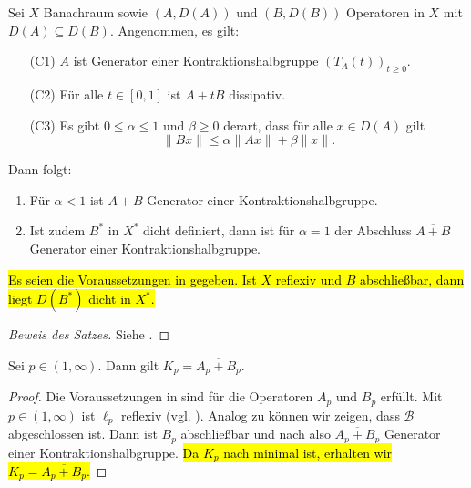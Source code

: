 \begin{fsatz}\label{toller satz}
Sei $X$ Banachraum sowie  $(A, D(A))$ und $(B, D(B))$ Operatoren in $X$ mit $D(A)\subseteq D(B)$. Angenommen, es gilt:
\begin{enumerate}
\item[\textnormal{(C1)}] $A$ ist Generator einer Kontraktionshalbgruppe  $(T_A(t))_{t\geq0}$.
\item[\textnormal{(C2)}] Für alle $t\in[0, 1]$ ist  $A+tB$ dissipativ.
\item[\textnormal{(C3)}] Es gibt $0\leq\alpha\leq 1 $ und $\beta\geq0$ derart, dass für alle $x\in D(A)$ gilt
\begin{equation*}
\|Bx\|\leq \alpha\|Ax\| + \beta\|x\|.
\end{equation*}
\end{enumerate}
Dann folgt:
\begin{enumerate}
\item Für $\alpha < 1$ ist $A+B$ Generator einer Kontraktionshalbgruppe.
\item Ist zudem $B^*$  in $X^*$ dicht definiert, dann ist für $\alpha =1$ der Abschluss $\overline{A+B}$ Generator einer Kontraktionshalbgruppe.
\end{enumerate}
\end{fsatz}

\begin{bem}
\hl{Es seien die Voraussetzungen in \mbox{} gegeben. Ist $X$ reflexiv und $B$ abschließbar, dann liegt $D(B^*)$ dicht in $X^*$.}
\end{bem}

\begin{proof}[Beweis des Satzes]
Siehe \cite{}.
\end{proof}



\begin{fsatz}
Sei $p\in(1,\infty)$. Dann gilt $K_p=\overline{A_p + B_p}$.
\end{fsatz}

\begin{proof}
Die Voraussetzungen in  sind für die Operatoren $A_p$ und $B_p$ erfüllt. Mit  $p\in (1,\infty)$ ist $\ell_p$ reflexiv (vgl. \cite{}). Analog zu  können wir zeigen, dass $\mathcal B$ abgeschlossen ist. Dann ist  $B_p$ abschließbar und nach  also  $\overline{A_p + B_p}$ Generator einer Kontraktionshalbgruppe. \hl{Da $K_p$ nach \mbox{} minimal ist, erhalten wir $K_p=\overline{A_p + B_p}$.}
\end{proof}



